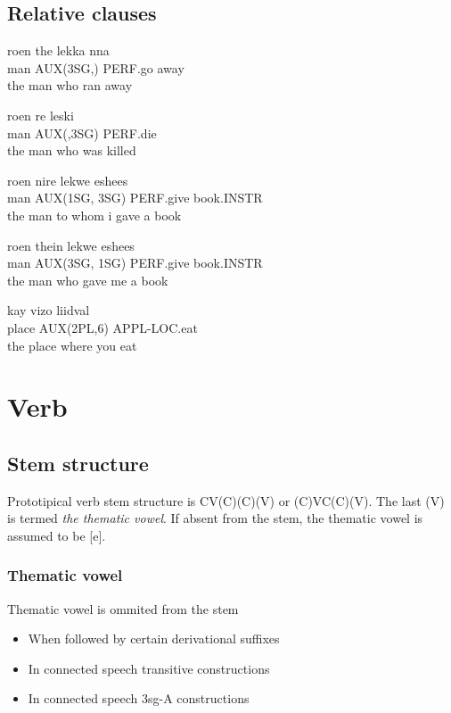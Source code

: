 \documentclass[8pt]{book}
\begin{document}
\section{Relative clauses}

\begin{exe}
\ex
\gll roen the lekka nna \\
 man AUX(3SG,) PERF.go away \\
\trans the man who ran away

\ex
\gll roen re leski \\
man AUX(,3SG) PERF.die \\
\trans the man who was killed


\ex
\gll roen nire lekwe eshees \\
man AUX(1SG, 3SG) PERF.give book.INSTR \\
\trans the man to whom i gave a book

\ex
\gll roen thein lekwe eshees \\
man AUX(3SG, 1SG) PERF.give book.INSTR \\
\trans the man who gave me a book

\ex
\gll kay vizo liidval \\
place AUX(2PL,6) APPL-LOC.eat \\
\trans the place where you eat
\end{exe}



\chapter{Verb}

\section{Stem structure}

Prototipical verb stem structure is CV(C)(C)(V) or (C)VC(C)(V). The last (V) is termed \textit{the thematic vowel}. If absent from the stem, the thematic vowel is assumed to be [e].

\subsection{Thematic vowel}
Thematic vowel is ommited from the stem
\begin{itemize}
	\item When followed by certain derivational suffixes
	\item In connected speech transitive constructions
	\item In connected speech 3sg-A constructions
\end{itemize}
\end{document}
